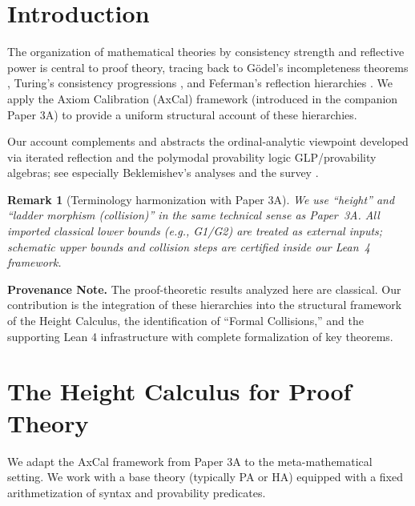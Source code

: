 \documentclass[11pt]{article}
\newtheorem{remark}[theorem]{Remark}
\begin{document}
\tableofcontents

\section{Introduction}

The organization of mathematical theories by consistency strength and reflective power is central to proof theory, tracing back to Gödel's incompleteness theorems \cite{Godel1931}, Turing's consistency progressions \cite{Turing1939}, and Feferman's reflection hierarchies \cite{Feferman1962}. We apply the Axiom Calibration (AxCal) framework (introduced in the companion Paper 3A) to provide a uniform structural account of these hierarchies.

Our account complements and abstracts the ordinal-analytic viewpoint developed via iterated reflection and the polymodal provability logic GLP/provability algebras; see especially Beklemishev's analyses \cite{Beklemishev2003,Beklemishev2004} and the survey \cite{ArtemovBeklemishev2004}.

\begin{remark}[Terminology harmonization with Paper 3A]
We use ``height'' and ``ladder morphism (collision)'' in the same technical sense as Paper~3A. All imported classical lower bounds (e.g., G1/G2) are treated as external inputs; schematic upper bounds and collision steps are certified inside our Lean~4 framework.
\end{remark}

\begin{mdframed}[style=provenance]
\textbf{Provenance Note.} The proof-theoretic results analyzed here are classical. Our contribution is the integration of these hierarchies into the structural framework of the Height Calculus, the identification of ``Formal Collisions,'' and the supporting Lean 4 infrastructure with complete formalization of key theorems.
\end{mdframed}

\section{The Height Calculus for Proof Theory}

We adapt the AxCal framework from Paper 3A to the meta-mathematical setting. We work with a base theory (typically PA or HA) equipped with a fixed arithmetization of syntax and provability predicates.
\end{document}
